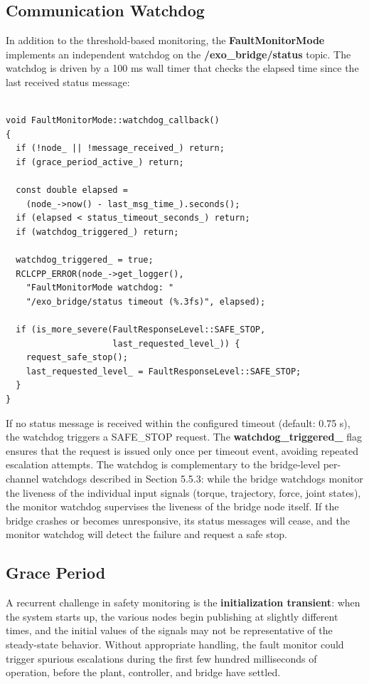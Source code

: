 \subsection{Communication Watchdog}
In addition to the threshold-based monitoring, the \textbf{FaultMonitorMode} implements an independent watchdog on the \textbf{/exo\_bridge/status} topic. The watchdog is driven by a 100 ms wall timer that checks the elapsed time since the last received status message:

\begin{verbatim}

void FaultMonitorMode::watchdog_callback()
{
  if (!node_ || !message_received_) return;
  if (grace_period_active_) return;

  const double elapsed =
    (node_->now() - last_msg_time_).seconds();
  if (elapsed < status_timeout_seconds_) return;
  if (watchdog_triggered_) return;

  watchdog_triggered_ = true;
  RCLCPP_ERROR(node_->get_logger(),
    "FaultMonitorMode watchdog: "
    "/exo_bridge/status timeout (%.3fs)", elapsed);

  if (is_more_severe(FaultResponseLevel::SAFE_STOP,
                     last_requested_level_)) {
    request_safe_stop();
    last_requested_level_ = FaultResponseLevel::SAFE_STOP;
  }
}

\end{verbatim}

If no status message is received within the configured timeout (default: 0.75 s), the watchdog triggers a SAFE\_STOP request. The \textbf{watchdog\_triggered\_} flag ensures that the request is issued only once per timeout event, avoiding repeated escalation attempts. The watchdog is complementary to the bridge-level per-channel watchdogs described in Section 5.5.3: while the bridge watchdogs monitor the liveness of the individual input signals (torque, trajectory, force, joint states), the monitor watchdog supervises the liveness of the bridge node itself. If the bridge crashes or becomes unresponsive, its status messages will cease, and the monitor watchdog will detect the failure and request a safe stop.

\subsection{Grace Period}
A recurrent challenge in safety monitoring is the \textbf{initialization transient}: when the system starts up, the various nodes begin publishing at slightly different times, and the initial values of the signals may not be representative of the steady-state behavior. Without appropriate handling, the fault monitor could trigger spurious escalations during the first few hundred milliseconds of operation, before the plant, controller, and bridge have settled.

